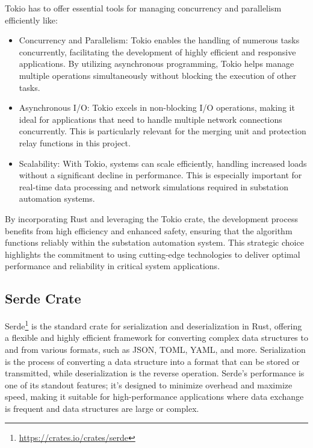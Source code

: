 Tokio has to offer essential tools for managing concurrency and parallelism efficiently like:

\begin{itemize} 
	\item Concurrency and Parallelism: Tokio enables the handling of numerous tasks concurrently, facilitating the development of highly efficient and responsive applications. By utilizing asynchronous programming, Tokio helps manage multiple operations simultaneously without blocking the execution of other tasks. 
	\item Asynchronous I/O: Tokio excels in non-blocking I/O operations, making it ideal for applications that need to handle multiple network connections concurrently. This is particularly relevant for the merging unit and protection relay functions in this project. 
	\item Scalability: With Tokio, systems can scale efficiently, handling increased loads without a significant decline in performance. This is especially important for real-time data processing and network simulations required in substation automation systems.
\end{itemize}

By incorporating Rust and leveraging the Tokio crate, the development process benefits from high efficiency and enhanced safety, ensuring that the algorithm functions reliably within the substation automation system. This strategic choice highlights the commitment to using cutting-edge technologies to deliver optimal performance and reliability in critical system applications.

\subsection{Serde Crate}

Serde\footnote{\url{https://crates.io/crates/serde}} is the standard crate for serialization and deserialization in Rust, offering a flexible and highly efficient framework for converting complex data structures to and from various formats, such as JSON, TOML, YAML, and more. Serialization is the process of converting a data structure into a format that can be stored or transmitted, while deserialization is the reverse operation. Serde's performance is one of its standout features; it’s designed to minimize overhead and maximize speed, making it suitable for high-performance applications where data exchange is frequent and data structures are large or complex.

